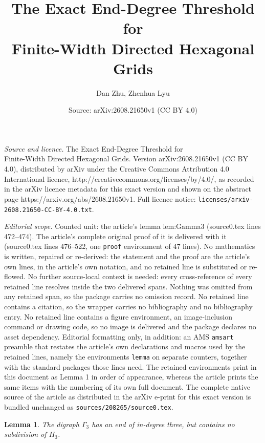 \documentclass[10pt,a4paper]{amsart}
\title{The Exact End-Degree Threshold for\\ Finite-Width Directed Hexagonal Grids}
\author{Dan Zhu, Zhenhua Lyu}
\date{Source: arXiv:2608.21650v1 (CC BY 4.0)}
\newtheorem{lemma}{Lemma}
\begin{document}
\maketitle

\noindent\emph{Source and licence.} The Exact End-Degree Threshold for\\ Finite-Width Directed Hexagonal Grids. Version arXiv:2608.21650v1 (CC BY 4.0), distributed by arXiv under the Creative Commons Attribution 4.0 International licence, http://creativecommons.org/licenses/by/4.0/, as recorded in the arXiv licence metadata for this exact version and shown on the abstract page https://arxiv.org/abs/2608.21650v1. Full licence notice: \texttt{licenses/arxiv-2608.21650-CC-BY-4.0.txt}.\par\smallskip

\noindent\textit{Editorial scope.} Counted unit: the article's lemma lem:Gamma3 (source0.tex lines 472--474). The article's complete original proof of it is delivered with it (source0.tex lines 476--522, one \texttt{proof} environment of 47 lines). No mathematics is written, repaired or re-derived: the statement and the proof are the article's own lines, in the article's own notation, and no retained line is substituted or re-flowed.  No further source-local context is needed: every cross-reference of every retained line resolves inside the two delivered spans.  Nothing was omitted from any retained span, so the package carries no omission record.  No retained line contains a citation, so the wrapper carries no bibliography and no bibliography entry.  No retained line contains a figure environment, an image-inclusion command or drawing code, so no image is delivered and the package declares no asset dependency.  Editorial formatting only, in addition: an AMS \texttt{amsart} preamble that restates the article's own declarations and macros used by the retained lines, namely the environments \texttt{lemma} on separate counters, together with the standard packages those lines need.  The retained environments print in this document as Lemma 1 in order of appearance, whereas the article prints the same items with the numbering of its own full document.  The complete native source of the article as distributed in the arXiv e-print for this exact version is bundled unchanged as \texttt{sources/208265/source0.tex}.
\begin{lemma}\label{lem:Gamma3}
The digraph $\Gamma_3$ has an end of in-degree three, but contains no subdivision of $H_3$.
\end{lemma}
\end{document}
